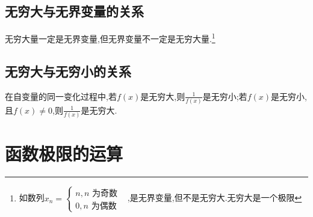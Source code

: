 \documentclass[12pt, a4paper, oneside, UTF8]{ctexbook}
\begin{document}
\begin{sloppypar}
    \subsection{无穷大与无界变量的关系}
    无穷大量一定是无界变量,但无界变量不一定是无穷大量.\footnote{如数列$x_n=\begin{cases}n,n\text{ 为奇数}\\0,n\text{ 为偶数}&\end{cases}$,是无界变量,但不是无穷大.无穷大是一个极限}
    \subsection{无穷大与无穷小的关系}
    在自变量的同一变化过程中,若$f(x)$是无穷大,则$\frac{1}{f(x)}$是无穷小;若$f(x)$是无穷小,且$f(x)\neq 0$,则$\frac{1}{f(x)}$是无穷大.
    \section{函数极限的运算}

\end{sloppypar}
\end{document}
